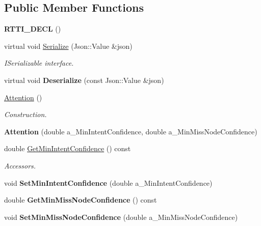 \subsection*{Public Member Functions}
\begin{DoxyCompactItemize}
\item 
\mbox{\label{class_attention_a01d452288b56763edcfbeab616d0d4bb}} 
{\bfseries R\+T\+T\+I\+\_\+\+D\+E\+CL} ()
\item 
\mbox{\label{class_attention_a441783dea3735b46e3c3b2f59f3aa49f}} 
virtual void \hyperlink{class_attention_a441783dea3735b46e3c3b2f59f3aa49f}{Serialize} (Json\+::\+Value \&json)
\begin{DoxyCompactList}\small\item\em I\+Serializable interface. \end{DoxyCompactList}\item 
\mbox{\label{class_attention_a61c66464d5611b07d758b4cc6b44edf1}} 
virtual void {\bfseries Deserialize} (const Json\+::\+Value \&json)
\item 
\mbox{\label{class_attention_a2774a77497bb424a4e1e6819f5716ce9}} 
\hyperlink{class_attention_a2774a77497bb424a4e1e6819f5716ce9}{Attention} ()
\begin{DoxyCompactList}\small\item\em Construction. \end{DoxyCompactList}\item 
\mbox{\label{class_attention_a4997f530ad9e16dce515de5936a4ea33}} 
{\bfseries Attention} (double a\+\_\+\+Min\+Intent\+Confidence, double a\+\_\+\+Min\+Miss\+Node\+Confidence)
\item 
\mbox{\label{class_attention_a281e498ba8e0c9f40964833d357be02d}} 
double \hyperlink{class_attention_a281e498ba8e0c9f40964833d357be02d}{Get\+Min\+Intent\+Confidence} () const
\begin{DoxyCompactList}\small\item\em Accessors. \end{DoxyCompactList}\item 
\mbox{\label{class_attention_aac64fc991f1fdf46900c39f2f0788f7e}} 
void {\bfseries Set\+Min\+Intent\+Confidence} (double a\+\_\+\+Min\+Intent\+Confidence)
\item 
\mbox{\label{class_attention_a34a86bb78a2b6dc1ee33fa2d0d290d8b}} 
double {\bfseries Get\+Min\+Miss\+Node\+Confidence} () const
\item 
\mbox{\label{class_attention_ad6ebd549f9698013376e208b416890eb}} 
void {\bfseries Set\+Min\+Miss\+Node\+Confidence} (double a\+\_\+\+Min\+Miss\+Node\+Confidence)
\end{DoxyCompactItemize}
